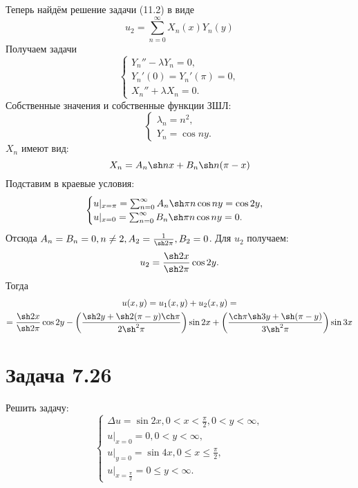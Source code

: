 \documentclass[11pt]{article}
\begin{document}
Теперь найдём решение задачи (11.2) в виде
\begin{equation*}
u_2 = \sum_{n = 0}^{\infty}X_n(x)Y_n(y)
\end{equation*}
Получаем задачи
\begin{equation*}
\begin{cases}
Y_n'' - \lambda Y_n = 0, \\
Y_n'(0) = Y_n'(\pi) = 0, \\
X_n'' + \lambda X_n = 0.
\end{cases}
\end{equation*}
Собственные значения и собственные функции ЗШЛ:
\begin{equation*}
\begin{cases}
\lambda_n = n^2, \\
Y_n = \cos ny.
\end{cases}
\end{equation*}
$X_n$ имеют вид:
\begin{equation*}
X_n = A_n\sh nx + B_n\sh n(\pi - x)
\end{equation*}
Подставим в краевые условия:
\begin{equation*}
\begin{cases}
u|_{x = \pi} = \sum_{n = 0}^{\infty}A_n\sh\pi n\cos ny = \cos2y, \\
u|_{x = 0} = \sum_{n = 0}^{\infty}B_n\sh\pi n\cos ny = 0.
\end{cases}
\end{equation*}
Отсюда $A_n = B_n = 0, n \neq 2, A_2 = \frac1{\sh2\pi}, B_2 = 0$. Для $u_2$ получаем:
\begin{equation}
u_2 = \frac{\sh2x}{\sh2\pi}\cos2y.
\end{equation}
Тогда
\begin{multline}
u(x, y) = u_1(x, y) + u_2(x, y) = \\
= \frac{\sh2x}{\sh2\pi}\cos2y -
\left(\frac{\sh2y + \sh2(\pi - y)\ch\pi}{2\sh^2\pi}\right)\sin2x +
\left(\frac{\ch\pi\sh3y + \sh(\pi - y)}{3\sh^2\pi}\right)\sin3x
\end{multline}
\section{Задача 7.26}
\label{sec:org7e46cd1}
Решить задачу:
\begin{equation}
\begin{cases}
\Delta u = \sin2x, 0 < x < \frac{\pi}2, 0 < y < \infty, \\
u|_{x = 0} = 0, 0 < y < \infty, \\
u|_{y = 0} = \sin4x, 0 \leq x \leq \frac{\pi}2, \\
u|_{x = \frac{\pi}2} = 0 \leq y < \infty.
\end{cases}
\end{equation}
\end{document}
